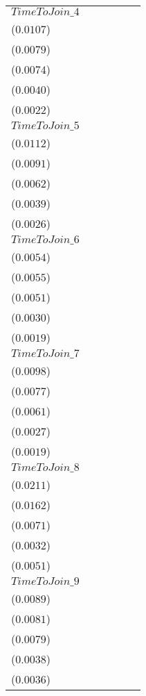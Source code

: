 \begin{tabular}{llllll}
$TimeToJoin\_4$   &    \makecell{$-0.0038^{}$ \\ ($0.0107$)} &    \makecell{$-0.0024^{}$ \\ ($0.0079$)} &  \makecell{$-0.0213^{***}$ \\ ($0.0074$)} &  \makecell{$-0.0110^{***}$ \\ ($0.0040$)} &     \makecell{$0.0036^{}$ \\ ($0.0022$)} \\
$TimeToJoin\_5$   &    \makecell{$-0.0004^{}$ \\ ($0.0112$)} &     \makecell{$0.0019^{}$ \\ ($0.0091$)} &  \makecell{$-0.0221^{***}$ \\ ($0.0062$)} &  \makecell{$-0.0113^{***}$ \\ ($0.0039$)} &    \makecell{$0.0050^{*}$ \\ ($0.0026$)} \\
$TimeToJoin\_6$   &    \makecell{$-0.0005^{}$ \\ ($0.0054$)} &    \makecell{$-0.0007^{}$ \\ ($0.0055$)} &  \makecell{$-0.0240^{***}$ \\ ($0.0051$)} &  \makecell{$-0.0129^{***}$ \\ ($0.0030$)} &   \makecell{$0.0042^{**}$ \\ ($0.0019$)} \\
$TimeToJoin\_7$   &    \makecell{$-0.0033^{}$ \\ ($0.0098$)} &    \makecell{$-0.0004^{}$ \\ ($0.0077$)} &  \makecell{$-0.0194^{***}$ \\ ($0.0061$)} &  \makecell{$-0.0119^{***}$ \\ ($0.0027$)} &  \makecell{$0.0050^{***}$ \\ ($0.0019$)} \\
$TimeToJoin\_8$   &     \makecell{$0.0238^{}$ \\ ($0.0211$)} &     \makecell{$0.0171^{}$ \\ ($0.0162$)} &  \makecell{$-0.0207^{***}$ \\ ($0.0071$)} &  \makecell{$-0.0129^{***}$ \\ ($0.0032$)} &     \makecell{$0.0081^{}$ \\ ($0.0051$)} \\
$TimeToJoin\_9$   &    \makecell{$0.0155^{*}$ \\ ($0.0089$)} &    \makecell{$0.0134^{*}$ \\ ($0.0081$)} &   \makecell{$-0.0198^{**}$ \\ ($0.0079$)} &  \makecell{$-0.0135^{***}$ \\ ($0.0038$)} &   \makecell{$0.0075^{**}$ \\ ($0.0036$)} \\

\end{tabular}

